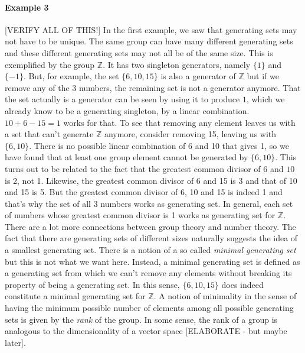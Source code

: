 \paragraph{Example 3} [VERIFY ALL OF THIS!] In the first example, we saw that generating sets may not have to be unique. The same group can have many different generating sets and these different generating sets may not all be of the same size. This is exemplified by the group $\mathbb{Z}$. It has two singleton generators, namely $\{1\}$ and $\{-1\}$. But, for example, the set $\{6,10,15\}$ is also a generator of $\mathbb{Z}$ but if we remove any of the 3 numbers, the remaining set is not a generator anymore. That the set actually is a generator can be seen by using it to produce $1$, which we already know to be a generating singleton, by a linear combination. $10 + 6 - 15 = 1$ works for that. To see that removing any element leaves us with a set that can't generate  $\mathbb{Z}$ anymore, consider removing 15, leaving us with $\{6,10\}$. There is no possible linear combination of 6 and 10 that gives 1, so we have found that at least one group element cannot be generated by $\{6,10\}$. This turns out to be related to the fact that the greatest common divisor of $6$ and $10$ is 2, not 1. Likewise, the greatest common divisor of 6 and 15 is 3 and that of 10 and 15 is 5. But the greatest common divisor of 6, 10 and 15 is indeed 1 and that's why the set of all 3 numbers works as generating set. In general, each set of numbers whose greatest common divisor is 1 works as generating set for $\mathbb{Z}$. There are a lot more connections between group theory and number theory. The fact that there are generating sets of different sizes naturally suggests the idea of a smallest generating set. There is a notion of a so called \emph{minimal generating set} but this is not what we want here. Instead, a minimal generating set is defined as a generating set from which we can't remove any elements without breaking its property of being a generating set. In this sense, $\{6,10,15\}$ does indeed constitute a minimal generating set for $\mathbb{Z}$. A notion of minimality in the sense of having the minimum possible number of elements among all possible generating sets is given by the \emph{rank} of the group. In some sense, the rank of a group is analogous to the dimensionality of a vector space [ELABORATE - but maybe later]. 


